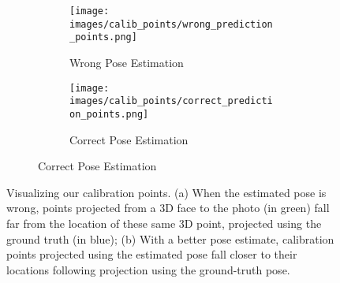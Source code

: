 \documentclass[final]{cvpr}
\begin{document}
\begin{figure}
    \begin{subfigure}[b]{0.475\textwidth}
        \begin{subfigure}[b]{0.495\textwidth}
            \centering
            \texttt{[image: images/calib\_points/wrong\_prediction\_points.png]}
            \caption{Wrong Pose Estimation}
        \end{subfigure}
        \hfill
            \begin{subfigure}[b]{0.495\textwidth}
            \centering
            \texttt{[image: images/calib\_points/correct\_prediction\_points.png]}
            \caption{Correct Pose Estimation}
        \end{subfigure}
    \end{subfigure}\vspace{-2mm}
    \caption{Visualizing our calibration points. (a) When the estimated pose is wrong, points projected from a 3D face to the photo (in green) fall far from the location of these same 3D point, projected using the ground truth (in blue); (b) With a better pose estimate, calibration points projected using the estimated pose fall closer to their locations following projection using the ground-truth pose.\vspace{-2mm}}
    \label{fig:calibpoints}
\end{figure}
\end{document}
